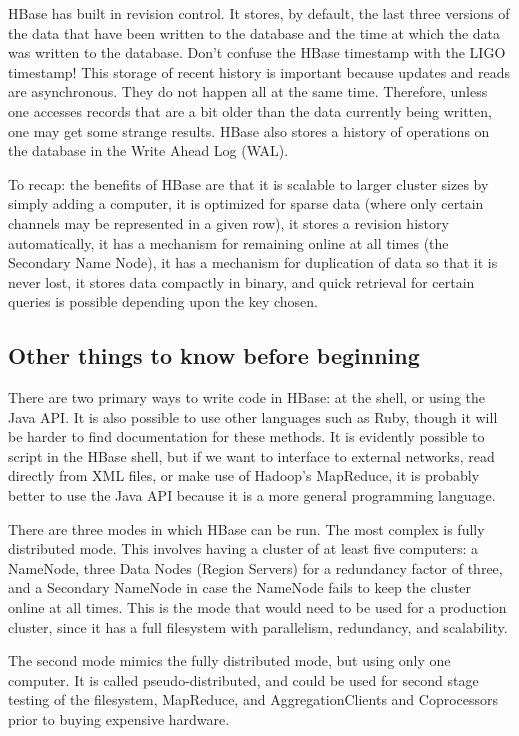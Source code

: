 \documentclass{article}
\begin{document}
HBase has built in revision control. It stores, by default, the last
three versions of the data that have been written to the database and
the time at which the data was written to the database. Don't confuse
the HBase timestamp with the LIGO timestamp! This storage of recent
history is important because updates and reads are asynchronous. They
do not happen all at the same time. Therefore, unless one accesses
records that are a bit older than the data currently being written,
one may get some strange results. HBase also stores a history
of operations on the database in the Write Ahead Log (WAL).

To recap: the benefits of HBase are that it is scalable to larger
cluster sizes by simply adding a computer, it is optimized for sparse
data (where only certain channels may be represented in a given row),
it stores a revision history automatically, it has a mechanism for
remaining online at all times (the Secondary Name Node), it has a
mechanism for duplication of data so that it is never lost, it stores
data compactly in binary, and quick retrieval for certain queries is
possible depending upon the key chosen.


\subsection{Other things to know before beginning}

There are two primary ways to write code in HBase: at the shell, or
using the Java API. It is also possible to use other languages such as
Ruby, though it will be harder to find documentation for these
methods. It is evidently possible to script in the HBase shell, but if
we want to interface to external networks, read directly from XML
files, or make use of Hadoop's MapReduce, it is probably better to use
the Java API because it is a more general programming language.

There are three modes in which HBase can be run. The most complex is
fully distributed mode. This involves having a cluster of at least
five computers: a NameNode, three Data Nodes (Region Servers) for a
redundancy factor of three, and a Secondary NameNode in case the
NameNode fails to keep the cluster online at all times. This is the
mode that would need to be used for a production cluster, since it has
a full filesystem with parallelism, redundancy, and scalability.

The second mode mimics the fully distributed mode, but using only one
computer. It is called pseudo-distributed, and could be used for second
stage testing of the filesystem, MapReduce, and AggregationClients and
Coprocessors prior to buying expensive hardware.
\end{document}
